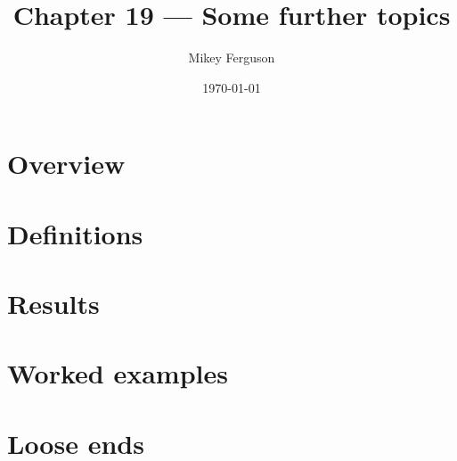 \documentclass[11pt]{article}
\title{Chapter 19 --- Some further topics}
\author{Mikey Ferguson}
\date{\today}
\begin{document}
\maketitle
\tableofcontents
\bigskip

\section{Overview}

\section{Definitions}

\section{Results}

\section{Worked examples}

\section{Loose ends}
\end{document}
